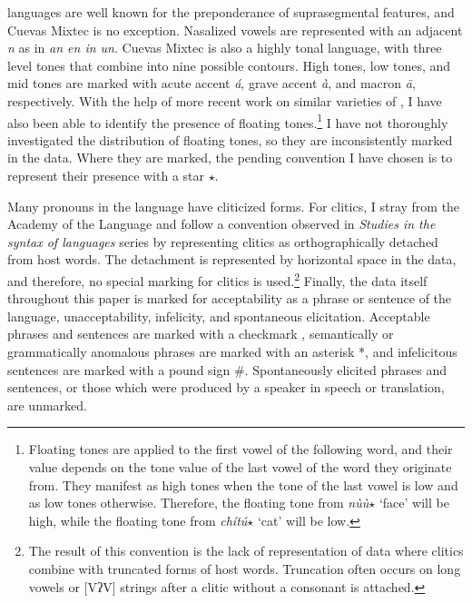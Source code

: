 \documentclass[output=paper,modfonts,nonflat]{langsci/langscibook}
\begin{document}
 languages are well known for the preponderance of suprasegmental features, and Cuevas Mixtec is no exception.  Nasalized vowels are represented with an adjacent \textit{n} as in \textit{an en in un}.   Cuevas Mixtec is also a highly tonal language, with three level tones that combine into nine possible contours.  High tones, low tones, and mid tones are marked with acute accent \textit{\'a}, grave accent \textit{\`a}, and macron \textit{\=a}, respectively.  With the help of more recent work on similar varieties of  \citep{Carroll2015}, I have also been able to identify the presence of floating tones.\footnote{ Floating tones are applied to the first vowel of the following word, and their value depends on the tone value of the last vowel of the word they originate from.  They manifest as high tones when the tone of the last vowel is low and as low tones otherwise.  Therefore, the floating tone from \textit{n\`u\`u$\star$} `face' will be high, while the floating tone from \textit{ch\'it\'u$\star$} `cat' will be low.}  I have not thoroughly investigated the distribution of floating tones, so they are inconsistently marked in the data.  Where they are marked, the pending convention I have chosen is to represent their presence with a star $\star$. 

Many pronouns in the language have cliticized forms.  For clitics, I stray from the Academy of the  Language and follow a convention observed in\linebreak {} \textit{Studies in the syntax of  languages} series by representing clitics as orthographically detached from host words.  The detachment is represented by horizontal space in the data, and therefore, no special marking for clitics is used.\footnote{The result of this convention is the lack of representation of data where clitics combine with truncated forms of host words.  Truncation often occurs on long vowels or [VʔV] strings after a clitic without a consonant is attached.}  Finally, the data itself throughout this paper is marked for acceptability as a phrase or sentence of the language, unacceptability, infelicity, and spontaneous elicitation.  Acceptable phrases and sentences are marked with a checkmark \checkmark, semantically or grammatically anomalous phrases are marked with an asterisk *, and infelicitous sentences are marked with a pound sign \#.  Spontaneously elicited phrases and sentences, or those which were produced by a speaker in speech or translation, are unmarked.
\end{document}
